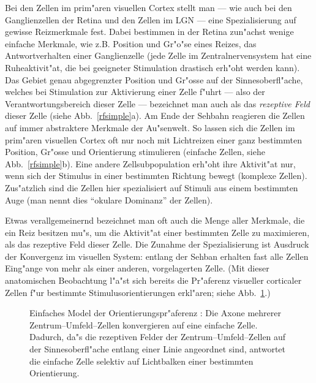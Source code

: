 Bei den Zellen im prim"aren visuellen Cortex stellt man --- wie auch bei
den Ganglienzellen der Retina und den Zellen im LGN --- eine
Spezialisierung auf gewisse Reizmerkmale fest.  Dabei bestimmen in der
Retina zun"achst wenige einfache Merkmale, wie z.B.  Position und Gr"o"se
eines Reizes, das Antwortverhalten einer Ganglienzelle (jede Zelle im
Zentralnervensystem hat eine Ruheaktivit"at, die bei geeigneter Stimulation
drastisch erh"oht werden kann).  Das Gebiet genau abgegrenzter Position und
Gr"osse auf der Sinnesoberfl"ache, welches bei Stimulation zur Aktivierung
einer Zelle f"uhrt --- also der Verantwortungsbereich dieser Zelle ---
bezeichnet man auch als das \emph{rezeptive Feld} dieser Zelle (siehe
Abb.~\ref{rfsimple}a).  Am Ende der Sehbahn reagieren die Zellen auf immer
abstraktere Merkmale der Au"senwelt.  So lassen sich die Zellen im
prim"aren visuellen Cortex oft nur noch mit Lichtreizen einer ganz
bestimmten Position, Gr"osse und Orientierung stimulieren (einfache Zellen,
siehe Abb.~\ref{rfsimple}b).  Eine andere Zellsubpopulation erh"oht ihre
Aktivit"at nur, wenn sich der Stimulus in einer bestimmten Richtung bewegt
(komplexe Zellen).  Zus"atzlich sind die Zellen hier spezialisiert auf
Stimuli aus einem bestimmten Auge (man nennt dies ``okulare Dominanz'' der
Zellen).

Etwas verallgemeinernd bezeichnet man oft auch die Menge aller Merkmale,
die ein Reiz besitzen mu"s, um die Aktivit"at einer bestimmten Zelle zu
maximieren, als das rezeptive Feld dieser Zelle.  Die Zunahme der
Spezialisierung ist Ausdruck der Konvergenz im visuellen System: entlang
der Sehban erhalten fast alle Zellen Eing"ange von mehr als einer anderen,
vorgelagerten Zelle. (Mit dieser anatomischen Beobachtung l"a"st sich
bereits die Pr"aferenz visueller corticaler Zellen f"ur bestimmte
Stimulusorientierungen erkl"aren; siehe Abb.~\ref{opmodel}.)

\begin{figure}[p]
\begin{center}
\end{center}
\caption{Einfaches Model der Orientierungspr"aferenz \protect\cite{hubel:1962}: 
Die Axone mehrerer Zentrum--Umfeld--Zellen konvergieren auf eine einfache
Zelle. Dadurch, da"s die rezeptiven Felder der Zentrum--Umfeld--Zellen auf
der Sinnesoberfl"ache entlang einer Linie angeordnet sind, antwortet die
einfache Zelle selektiv auf Lichtbalken einer bestimmten Orientierung.}
\label{opmodel}
\end{figure}

